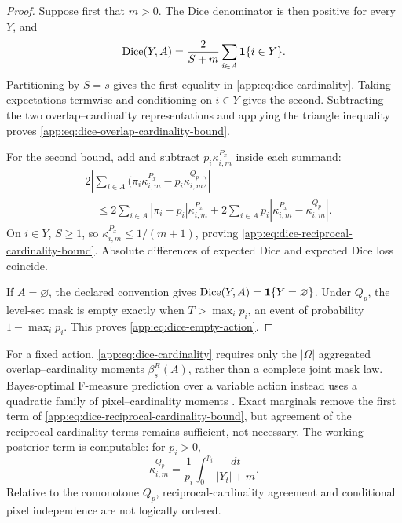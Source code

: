 \begin{proof}
Suppose first that $m>0$. The Dice denominator is then positive for every
$Y$, and
\begin{equation*}
  \operatorname{Dice}(Y,A)
  =
  \frac{2}{S+m}
  \sum_{i\in A}\mathbf 1\{i\in Y\}.
\end{equation*}
Partitioning by $S=s$ gives the first equality in
\cref{app:eq:dice-cardinality}. Taking expectations termwise and conditioning
on $i\in Y$ gives the second. Subtracting the two overlap--cardinality
representations and applying the triangle inequality proves
\cref{app:eq:dice-overlap-cardinality-bound}.

For the second bound, add and subtract
$p_i\kappa_{i,m}^{P_x}$ inside each summand:
\begin{align*}
  &2\left|
    \sum_{i\in A}
      \bigl(
        \pi_i\kappa_{i,m}^{P_x}
        -
        p_i\kappa_{i,m}^{Q_p}
      \bigr)
    \right|\\
  &\quad\leq
  2\sum_{i\in A}|\pi_i-p_i|\kappa_{i,m}^{P_x}
  +
  2\sum_{i\in A}p_i
    |\kappa_{i,m}^{P_x}-\kappa_{i,m}^{Q_p}|.
\end{align*}
On $i\in Y$, $S\geq1$, so
$\kappa_{i,m}^{P_x}\leq1/(m+1)$, proving
\cref{app:eq:dice-reciprocal-cardinality-bound}. Absolute differences of
expected Dice and expected Dice loss coincide.

If $A=\varnothing$, the declared convention gives
$\operatorname{Dice}(Y,A)=\mathbf 1\{Y=\varnothing\}$. Under $Q_p$, the level-set mask is
empty exactly when $T>\max_i p_i$, an event of probability
$1-\max_i p_i$. This proves \cref{app:eq:dice-empty-action}.
\end{proof}

For a fixed action, \cref{app:eq:dice-cardinality} requires only the
$|\Omega|$ aggregated overlap--cardinality moments $\beta_s^R(A)$, rather than
a complete joint mask law. Bayes-optimal F-measure prediction over a variable
action instead uses a quadratic family of pixel--cardinality moments
\citep{waegeman2014}. Exact marginals remove the first term of
\cref{app:eq:dice-reciprocal-cardinality-bound}, but agreement of the
reciprocal-cardinality terms remains sufficient, not necessary. The
working-posterior term is computable: for $p_i>0$,
\begin{equation*}
  \kappa_{i,m}^{Q_p}
  =
  \frac{1}{p_i}\int_0^{p_i}\frac{dt}{|Y_t|+m}.
\end{equation*}
Relative to the comonotone $Q_p$, reciprocal-cardinality agreement and
conditional pixel independence are not logically ordered.

